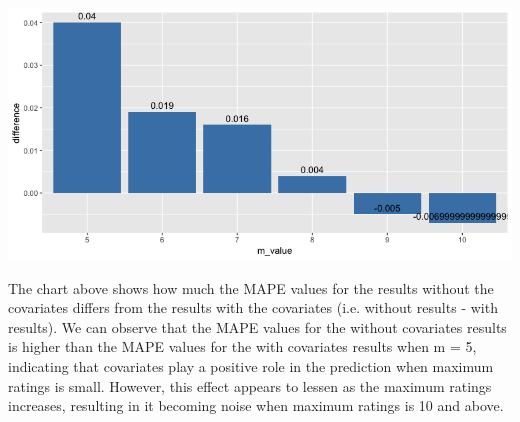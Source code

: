 \documentclass{article}
\begin{document}
\includegraphics[scale=0.5]{WithAndWithoutCovariatesMAPEComparison.png}

The chart above shows how much the MAPE values for the results without the covariates differs from the results with the covariates (i.e. without results - with results). We can observe that the MAPE values for the without covariates results is higher than the MAPE values for the with covariates results when m = 5, indicating that covariates play a positive role in the prediction when maximum ratings is small. However, this effect appears to lessen as the maximum ratings increases, resulting in it becoming noise when maximum ratings is 10 and above. 
\end{document}
